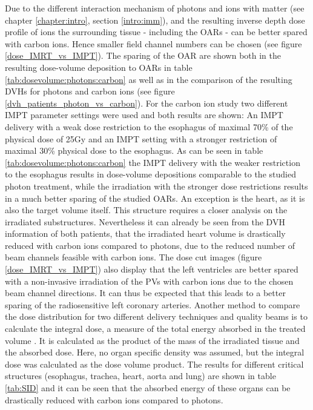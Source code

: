 \newpage

Due to the different interaction mechanism of photons and ions with matter (see chapter \ref{chapter:intro}, section \ref{intro:imm}), and the 
resulting  inverse depth dose profile of ions the surrounding tissue - including the OARs - can be better spared with carbon ions. Hence 
smaller field channel numbers can be chosen (see figure \ref{dose_IMRT_vs_IMPT}). The sparing of the OAR are shown both in the resulting 
dose-volume deposition to OARs in table \ref{tab:dosevolume:photons:carbon} as well as in the comparison of the resulting DVHs for photons and 
carbon ions (see figure \ref{dvh_patients_photon_vs_carbon}). For the carbon ion study two different IMPT parameter settings were used and 
both results are shown: An IMPT delivery with a weak dose restriction to the esophagus of maximal 70\% of the physical dose of 25Gy and 
an IMPT setting with a stronger restriction of maximal 30\% physical dose to the esophagus. As can be seen in table \ref{tab:dosevolume:photons:carbon} 
the IMPT delivery with the weaker restriction to the esophagus results in dose-volume depositions comparable to the studied photon treatment, while 
the irradiation with the stronger dose restrictions results in a much better sparing of the studied OARs. An exception 
is the heart, as it is also the target volume itself. This structure requires a closer analysis on the irradiated substructures. 
Nevertheless it can already be seen from the DVH information of both patients, that the irradiated heart volume is drastically reduced 
with carbon ions compared to photons, due to the reduced number of beam channels feasible with carbon ions. 
The dose cut images (figure \ref{dose_IMRT_vs_IMPT}) also display that the left ventricles are better 
spared with a non-invasive irradiation of the PVs with carbon ions due to the chosen beam channel directions. It can thus be expected that 
this leads to a better sparing of the radiosensitive left coronary arteries. \newline
\newline
Another method to compare the dose distribution for two different delivery techniques and quality beams is to calculate the integral dose, 
a measure of the total energy absorbed in the treated volume \cite{Kha10}. It is calculated as the product of the mass of the irradiated tissue 
and the absorbed dose. Here, no organ specific density was assumed, but the integral dose was calculated as the dose volume product.  
The results for different critical structures (esophagus, trachea, heart, aorta and lung) are shown in table \ref{tab:SID} 
and it can be seen that the absorbed energy of these organs can be drastically reduced with carbon ions 
compared to photons.

